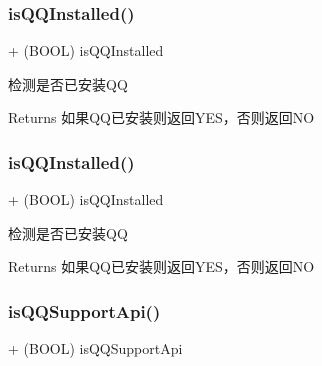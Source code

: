 \subsubsection{\texorpdfstring{is\+Q\+Q\+Installed()}{isQQInstalled()}\hspace{0.1cm}{\footnotesize\ttfamily [1/2]}}
{\footnotesize\ttfamily + (B\+O\+OL) is\+Q\+Q\+Installed \begin{DoxyParamCaption}{ }\end{DoxyParamCaption}}

检测是否已安装\+QQ \begin{DoxyReturn}{Returns}
如果\+Q\+Q已安装则返回\+Y\+E\+S，否则返回\+NO 
\end{DoxyReturn}
\mbox{\label{interface_q_q_api_interface_a3cce7811084fbe0fac86a61068a5bb8f}} 
\subsubsection{\texorpdfstring{is\+Q\+Q\+Installed()}{isQQInstalled()}\hspace{0.1cm}{\footnotesize\ttfamily [2/2]}}
{\footnotesize\ttfamily + (B\+O\+OL) is\+Q\+Q\+Installed \begin{DoxyParamCaption}{ }\end{DoxyParamCaption}}

检测是否已安装\+QQ \begin{DoxyReturn}{Returns}
如果\+Q\+Q已安装则返回\+Y\+E\+S，否则返回\+NO 
\end{DoxyReturn}
\mbox{\label{interface_q_q_api_interface_a3669fca9c3a1df5991416dc3a5a719c4}} 
\subsubsection{\texorpdfstring{is\+Q\+Q\+Support\+Api()}{isQQSupportApi()}\hspace{0.1cm}{\footnotesize\ttfamily [1/2]}}
{\footnotesize\ttfamily + (B\+O\+OL) is\+Q\+Q\+Support\+Api \begin{DoxyParamCaption}{ }\end{DoxyParamCaption}}

